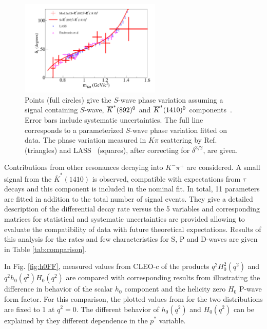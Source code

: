 \begin{figure}[!htb]
	\centering
\includegraphics[width=0.6\textwidth]{figures/charm/sl_babar_swave_hfag2012.pdf}
\caption{Points (full circles) give the \babar $S$-wave phase variation 
assuming a signal containing $S$-wave, $\overline{K}^*(892)^0$ and $\overline{K}^*(1410)^0$ components~\cite{delAmoSanchez:2010fd}.
Error bars include systematic uncertainties.
The full line corresponds to a parameterized $S$-wave phase variation fitted on \babar data.
The phase variation measured in $K\pi$ scattering
by Ref.~\cite{Estabrooks:1977xe} (triangles) and LASS~\cite{Aston:1987ir} (squares), 
after correcting for $\delta^{3/2}$, are given.}
\label{fig:swave_phase}
\end{figure}

Contributions from other resonances decaying into $K^-\pi^+$ are considered.
A small signal from the $\overline{K}^*(1410)$ is observed, compatible
with expectations from $\tau$ decays and this component is included in the
nominal fit. In total, 11 parameters are fitted in addition to the total
number of signal events. They give a detailed description of the differential
decay rate versus the 5 variables and corresponding matrices for 
statistical and systematic uncertainties are provided allowing to 
evaluate the compatibility of data with future theoretical expectations.
Results of this analysis for the rates and few characteristics 
for S, P and D-waves are given in Table \ref{tab:comparison}.

In Fig. \ref{fig:h0FF}, measured values from CLEO-c
of the products $q^2H_0^2(q^2)$ and $q^2h_0(q^2)H_0(q^2)$ are compared with 
corresponding results from \babar illustrating the difference in behavior
of the scalar $h_0$ component and the helicity zero $H_0$ P-wave form factor.
For this comparison, the plotted values from \babar for the two distributions
are fixed to 1 at $q^2=0$. The different behavior of $h_0(q^2)$
and $H_0(q^2)$ can be explained by they different dependence in the 
$p^*$ variable.

